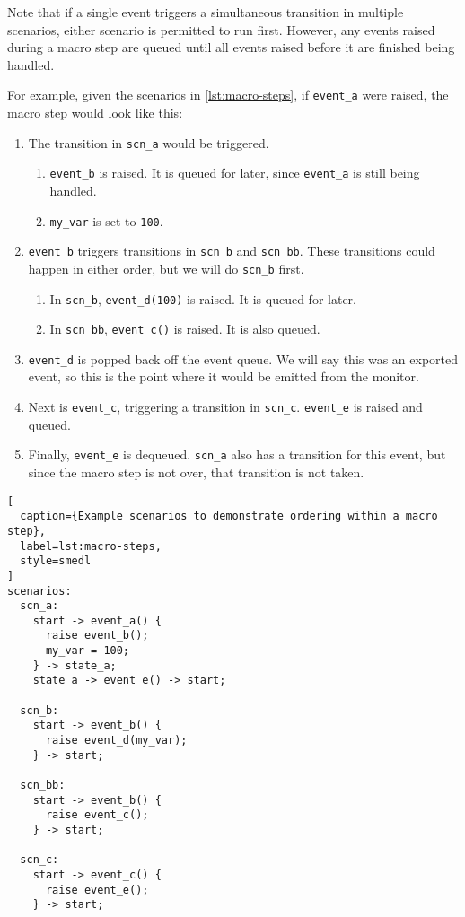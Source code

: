 \documentclass[paper=letter,titlepage,captions=tableheading]{scrartcl}
\begin{document}
Note that if a single event triggers a simultaneous transition in multiple
scenarios, either scenario is permitted to run first. However, any events
raised during a macro step are queued until all events raised before it are
finished being handled.

For example, given the scenarios in \autoref{lst:macro-steps}, if
\texttt{event\_a} were raised, the macro step would look like this:
\begin{enumerate}
  \item The transition in \texttt{scn\_a} would be triggered.
    \begin{enumerate}
      \item \texttt{event\_b} is raised. It is queued for later, since
        \texttt{event\_a} is still being handled.
      \item \texttt{my\_var} is set to \texttt{100}.
    \end{enumerate}
  \item \texttt{event\_b} triggers transitions in \texttt{scn\_b} and
    \texttt{scn\_bb}. These transitions could happen in either order, but we
    will do \texttt{scn\_b} first.
    \begin{enumerate}
      \item In \texttt{scn\_b}, \texttt{event\_d(100)} is raised. It is queued
        for later.
      \item In \texttt{scn\_bb}, \texttt{event\_c()} is raised. It is also
        queued.
    \end{enumerate}
  \item \texttt{event\_d} is popped back off the event queue. We will say this
    was an exported event, so this is the point where it would be emitted from
    the monitor.
  \item Next is \texttt{event\_c}, triggering a transition in \texttt{scn\_c}.
    \texttt{event\_e} is raised and queued.
  \item Finally, \texttt{event\_e} is dequeued. \texttt{scn\_a} also has a
    transition for this event, but since the macro step is not over, that
    transition is not taken.
\end{enumerate}

\begin{lstlisting}[
  caption={Example scenarios to demonstrate ordering within a macro step},
  label=lst:macro-steps,
  style=smedl
]
scenarios:
  scn_a:
    start -> event_a() {
      raise event_b();
      my_var = 100;
    } -> state_a;
    state_a -> event_e() -> start;

  scn_b:
    start -> event_b() {
      raise event_d(my_var);
    } -> start;

  scn_bb:
    start -> event_b() {
      raise event_c();
    } -> start;

  scn_c:
    start -> event_c() {
      raise event_e();
    } -> start;
\end{lstlisting}
\end{document}
